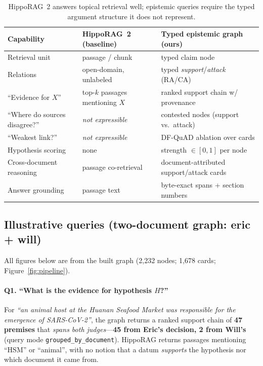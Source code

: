 \begin{table}[t]
\centering
\small
\setlength{\tabcolsep}{5pt}
\renewcommand{\arraystretch}{1.15}
\begin{tabular}{@{}p{2.5cm}p{5.1cm}p{5.1cm}@{}}
\toprule
\textbf{Capability} & \textbf{HippoRAG~2 (baseline)} & \textbf{Typed epistemic graph (ours)} \\
\midrule
Retrieval unit & passage / chunk & typed claim node \\
Relations & open-domain, unlabeled & typed \emph{support}/\emph{attack} (RA/CA) \\
``Evidence for $X$'' & top-$k$ passages mentioning $X$ & ranked support chain w/ provenance \\
``Where do sources disagree?'' & \emph{not expressible} & contested nodes (support vs.\ attack) \\
``Weakest link?'' & \emph{not expressible} & DF-QuAD ablation over cards \\
Hypothesis scoring & none & strength $\in[0,1]$ per node \\
Cross-document reasoning & passage co-retrieval & document-attributed support/attack cards \\
Answer grounding & passage text & byte-exact spans + section numbers \\
\bottomrule
\end{tabular}
\caption{HippoRAG~2 answers topical retrieval well; epistemic queries require the typed
argument structure it does not represent.}
\label{tab:comparison}
\end{table}

\subsection{Illustrative queries (two-document graph: eric + will)}
\label{sec:queries}

All figures below are from the built graph (2{,}232 nodes; 1{,}678 cards;
Figure~\ref{fig:pipeline}).

\paragraph{Q1. ``What is the evidence for hypothesis $H$?''}
For \emph{``an animal host at the Huanan Seafood Market was responsible for the emergence
of SARS-CoV-2''}, the graph returns a ranked support chain of \textbf{47 premises} that
\emph{spans both judges}---\textbf{45 from Eric's decision, 2 from Will's} (query mode
\texttt{grouped\_by\_document}). HippoRAG returns passages mentioning ``HSM'' or
``animal'', with no notion that a datum \emph{supports} the hypothesis nor which document
it came from.

